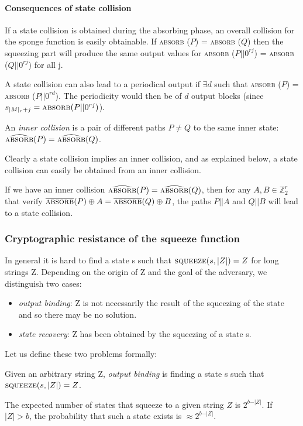 \paragraph{Consequences of state collision}
If a state collision is obtained during the absorbing phase, an overall collision for the sponge function is easily obtainable.
If \textsc{absorb} ($P$) = \textsc{absorb} ($Q$) then the squeezing part will produce the same output values for \textsc{absorb} ($P\vert \vert 0^{rj}$) = \textsc{absorb} ($Q\vert \vert 0^{rj}$) for all j.

A state collision can also lead to a periodical output if $\exists d$ such that \textsc{absorb} ($P$) = \textsc{absorb} ($P\vert \vert 0^{rd}$). The periodicity would then be of $d$ output blocks (since $s_{\vert M\vert_r + j} = \textsc{absorb}(P\vert \vert 0^{rj})$).


\begin{defn}
An \emph{inner collision} is a pair of different paths $P \ne Q$ to the same inner state:
$\widehat{\textsc{absorb}}(P) = \widehat{\textsc{absorb}}(Q)$.
\end{defn}

Clearly a state collision implies an inner collision, and as explained below, a state collision can easily be obtained from an inner collision.

If we have an inner collision $\widehat{\textsc{absorb}}(P) = \widehat{\textsc{absorb}}(Q)$, then for any $A,B \in \mathbb Z_2^r$ that verify $\overline{\textsc{absorb}}(P)\oplus A = \overline{\textsc{absorb}}(Q) \oplus B$, the paths $P\vert \vert A$ and $Q \vert \vert B$ will lead to a state collision.

\subsubsection{Cryptographic resistance of the squeeze function}
In general it is hard to find a state s such that $\textsc{squeeze}(s, \vert Z\vert ) = Z$ for long strings Z. Depending on the origin of Z and the goal of the adversary, we distinguish two cases: 
\begin{itemize}[label=\textperiodcentered,nolistsep]
\item \emph{output binding}: Z is not necessarily the result of the squeezing of the state and so there may be no solution.
\item \emph{state recovery}: Z has been obtained by the squeezing of a state s.
\end{itemize}
Let us define these two problems formally:
\begin{defn}
Given an arbitrary string Z, \emph{output binding} is finding a state s such that $\textsc{squeeze}(s, \vert Z\vert ) = Z$.
\end{defn}
The expected number of states that squeeze to a given string $Z$ is $2^{b−\vert Z\vert}$. If $\vert Z\vert  > b$, the probability that such a state exists is $\approx 2^{b−\vert Z\vert }$.


